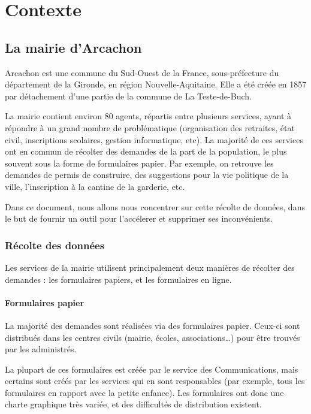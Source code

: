 \documentclass[11pt,french]{memoir}
\begin{document}
	\tableofcontents

	\mainmatter


	\chapter{Contexte}\label{ch:contexte}


	\section{La mairie d'Arcachon}\label{sec:la-mairie-d'arcachon}

	Arcachon est une commune du Sud-Ouest de la France, sous-préfecture du département de la Gironde, en région Nouvelle-Aquitaine.
	Elle a été créée en 1857 par détachement d'une partie de la commune de La Teste-de-Buch.

	La mairie contient environ 80 agents, répartis entre plusieurs services, ayant à répondre à un grand nombre de problématique (organisation des retraites, état civil, inscriptions scolaires, gestion informatique, etc).
	La majorité de ces services ont en commun de récolter des demandes de la part de la population, le plus souvent sous la forme de formulaires papier.
	Par exemple, on retrouve les demandes de permis de construire, des suggestions pour la vie politique de la ville, l'inscription à la cantine de la garderie, etc.

	Dans ce document, nous allons nous concentrer sur cette récolte de données, dans le but de fournir un outil pour l'accélerer et supprimer ses inconvénients.

	\subsection{Récolte des données}\label{subsec:recolte-des-donnees}

	Les services de la mairie utilisent principalement deux manières de récolter des demandes : les formulaires papiers, et les formulaires en ligne.

	\subsubsection{Formulaires papier}

	La majorité des demandes sont réalisées via des formulaires papier.
	Ceux-ci sont distribués dans les centres civils (mairie, écoles, associations…) pour être trouvés par les administrés.

	La plupart de ces formulaires est créée par le service des Communications, mais certains sont créés par les services qui en sont responsables (par exemple, tous les formulaires en rapport avec la petite enfance).
	Les formulaires ont donc une charte graphique très variée, et des difficultés de distribution existent.
\end{document}
